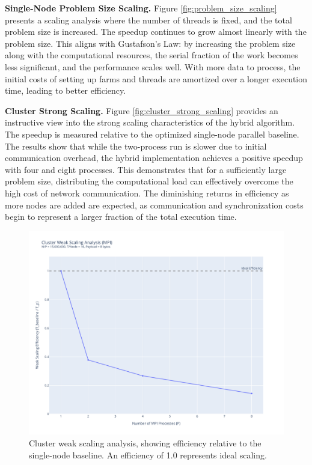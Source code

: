 \documentclass[10pt]{article}
\begin{document}
\textbf{Single-Node Problem Size Scaling.} Figure \ref{fig:problem_size_scaling} presents a scaling analysis where the number of threads is fixed, and the total problem size is increased. The speedup continues to grow almost linearly with the problem size. This aligns with Gustafson's Law: by increasing the problem size along with the computational resources, the serial fraction of the work becomes less significant, and the performance scales well. With more data to process, the initial costs of setting up farms and threads are amortized over a longer execution time, leading to better efficiency.

\textbf{Cluster Strong Scaling.} Figure \ref{fig:cluster_strong_scaling} provides an instructive view into the strong scaling characteristics of the hybrid algorithm. The speedup is measured relative to the optimized single-node parallel baseline. The results show that while the two-process run is slower due to initial communication overhead, the hybrid implementation achieves a positive speedup with four and eight processes. This demonstrates that for a sufficiently large problem size, distributing the computational load can effectively overcome the high cost of network communication. The diminishing returns in efficiency as more nodes are added are expected, as communication and synchronization costs begin to represent a larger fraction of the total execution time.

\begin{figure}[H]
    \centering
    \includegraphics[width=0.5\linewidth]{../python/plots/cluster_weak_scaling.pdf}
    \caption{Cluster weak scaling analysis, showing efficiency relative to the single-node baseline. An efficiency of 1.0 represents ideal scaling.}
    \label{fig:cluster_weak_scaling}
\end{figure}
\end{document}
